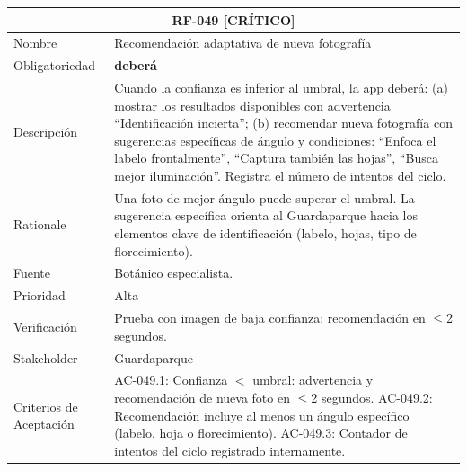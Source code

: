 \documentclass[12pt, a4paper]{article}
\newcommand{\criticomark}{\textcolor{criticolor}{\textbf{[CR\'ITICO]}}}
\begin{document}
\begin{longtable}{|p{3cm}|p{11.5cm}|}
\hline
\multicolumn{2}{|c|}{\textbf{RF-049} \criticomark} \\
\hline
Nombre & Recomendaci\'on adaptativa de nueva fotograf\'ia \\
\hline
Obligatoriedad & \textbf{deber\'a} \\
\hline
Descripci\'on & Cuando la confianza es inferior al umbral, la app deber\'a: (a) mostrar los resultados disponibles con advertencia ``Identificaci\'on incierta''; (b) recomendar nueva fotograf\'ia con sugerencias espec\'ificas de \'angulo y condiciones: ``Enfoca el labelo frontalmente'', ``Captura tambi\'en las hojas'', ``Busca mejor iluminaci\'on''. Registra el n\'umero de intentos del ciclo. \\
\hline
Rationale & Una foto de mejor \'angulo puede superar el umbral. La sugerencia espec\'ifica orienta al Guardaparque hacia los elementos clave de identificaci\'on (labelo, hojas, tipo de florecimiento). \\
\hline
Fuente & Bot\'anico especialista. \\
\hline
Prioridad & Alta \\
\hline
Verificaci\'on & Prueba con imagen de baja confianza: recomendaci\'on en $\leq$2 segundos. \\
\hline
Stakeholder & Guardaparque \\
\hline
Criterios de Aceptaci\'on &
AC-049.1: Confianza $<$ umbral: advertencia y recomendaci\'on de nueva foto en $\leq$2 segundos. \newline
AC-049.2: Recomendaci\'on incluye al menos un \'angulo espec\'ifico (labelo, hoja o florecimiento). \newline
AC-049.3: Contador de intentos del ciclo registrado internamente. \\
\hline
\end{longtable}
\end{document}
